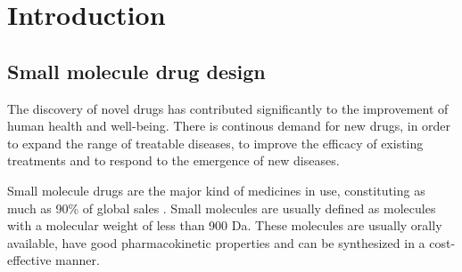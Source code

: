 \chapter{Introduction\label{chap:introduction}}

\section{Small molecule drug design\label{sec:drug-design}}
The discovery of novel drugs has contributed significantly to the improvement of human health and
well-being. There is continous demand for new drugs, in order to expand the range of treatable
diseases, to improve the efficacy of existing treatments and to respond to the emergence of new
diseases.

Small molecule drugs are the major kind of medicines in use, constituting as much as 90\% of global
sales \citep{makurvetBiologicsVsSmall2021}. Small molecules are usually defined as molecules with a
molecular weight of less than 900 Da. These molecules are usually orally available, have good
pharmacokinetic properties and can be synthesized in a cost-effective manner.

